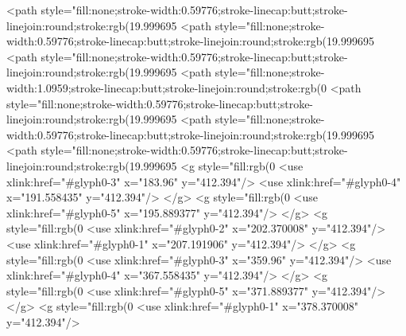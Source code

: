 <path style="fill:none;stroke-width:0.59776;stroke-linecap:butt;stroke-linejoin:round;stroke:rgb(19.999695%
<path style="fill:none;stroke-width:0.59776;stroke-linecap:butt;stroke-linejoin:round;stroke:rgb(19.999695%
<path style="fill:none;stroke-width:0.59776;stroke-linecap:butt;stroke-linejoin:round;stroke:rgb(19.999695%
<path style="fill:none;stroke-width:1.0959;stroke-linecap:butt;stroke-linejoin:round;stroke:rgb(0%
<path style="fill:none;stroke-width:0.59776;stroke-linecap:butt;stroke-linejoin:round;stroke:rgb(19.999695%
<path style="fill:none;stroke-width:0.59776;stroke-linecap:butt;stroke-linejoin:round;stroke:rgb(19.999695%
<path style="fill:none;stroke-width:0.59776;stroke-linecap:butt;stroke-linejoin:round;stroke:rgb(19.999695%
<g style="fill:rgb(0%
  <use xlink:href="#glyph0-3" x="183.96" y="412.394"/>
  <use xlink:href="#glyph0-4" x="191.558435" y="412.394"/>
</g>
<g style="fill:rgb(0%
  <use xlink:href="#glyph0-5" x="195.889377" y="412.394"/>
</g>
<g style="fill:rgb(0%
  <use xlink:href="#glyph0-2" x="202.370008" y="412.394"/>
  <use xlink:href="#glyph0-1" x="207.191906" y="412.394"/>
</g>
<g style="fill:rgb(0%
  <use xlink:href="#glyph0-3" x="359.96" y="412.394"/>
  <use xlink:href="#glyph0-4" x="367.558435" y="412.394"/>
</g>
<g style="fill:rgb(0%
  <use xlink:href="#glyph0-5" x="371.889377" y="412.394"/>
</g>
<g style="fill:rgb(0%
  <use xlink:href="#glyph0-1" x="378.370008" y="412.394"/>
